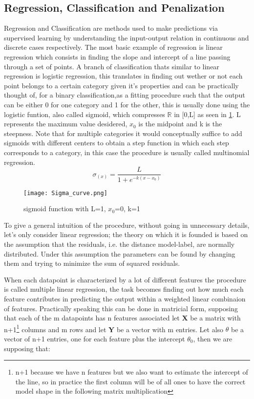 \subsection{Regression, Classification and Penalization}
Regression and Classification are methods used to make predictions via supervised learning by understanding the input-output relation in continuous and discrete cases respectively. The most basic example of regression is linear regression which consists in finding the slope and intercept of a line passing through a set of points. A branch of classification thats similar to linear regression is logistic regression, this translates in finding out wether or not each point belongs to a certain category given it's properties and can be practically thought of, for a binary classification,as a fitting procedure such that the output can be either 0 for one category and 1 for the other, this is usually done using the logistic funtion, also called sigmoid, which compresses $\mathbb {R}$ in [0,L] as seen in  \ref{sigmoid}. L represents the maximum value desidered, $x_0$ is the midpoint and k is the steepness. Note that for multiple categories it would conceptually suffice to add sigmoids with different centers to obtain a step function in which each step corresponds to a category, in this case the procedure is usually called multinomial regression.
\begin{equation}
\sigma_{(x)} = \frac{L}{1+e^{-k(x-x_0)}}
\end{equation}

\begin{figure}[H]
		\centering
  		\texttt{[image: Sigma\_curve.png]}
        \caption{sigmoid function with L=1, $x_0$=0, k=1 \label{sigmoid}}
\end{figure}

To give a general intuition of the procedure, without going in unnecessary details, let's only consider linear regression; the theory on which it is founded is based on the assumption that the residuals, i.e. the distance model-label, are normally distributed. Under this assumption the parameters can be found by changing them and trying to minimize the sum of squared residuals.

When each datapoint is characterized by a lot of different features the procedure is called multiple linear regression, the task becomes finding out how much each feature contributes in predicting the output within a weighted linear combinaion of features. Practically speaking this can be done in matricial form, supposing that each of the m datapoints has n features associated let  \textbf{X} be a matrix with n+1\footnote{n+1 because we have n features but we also want to estimate the intercept of the line, so in practice the first column will be of all ones to have the correct model shape in the following matrix multiplication} columns and m rows and let  \textbf{Y} be a vector with m entries. Let also  \textbf{$\theta$} be a vector of n+1 entries, one for each feature plus the intercept $\theta_0$, then we are supposing that:

